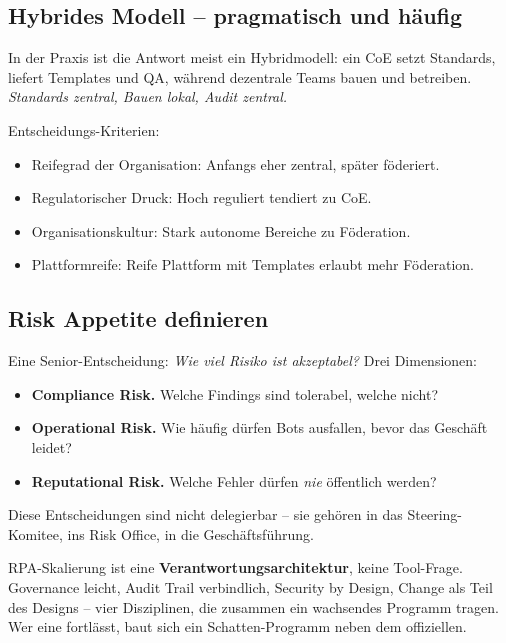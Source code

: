 \documentclass[11pt,a4paper,oneside]{article}
\begin{document}
\subsection{Hybrides Modell -- pragmatisch und häufig}

In der Praxis ist die Antwort meist ein Hybridmodell: ein CoE setzt Standards, liefert Templates und QA, während dezentrale Teams bauen und betreiben. \emph{Standards zentral, Bauen lokal, Audit zentral.}

Entscheidungs-Kriterien:

\begin{itemize}
  \item Reifegrad der Organisation: Anfangs eher zentral, später föderiert.
  \item Regulatorischer Druck: Hoch reguliert tendiert zu CoE.
  \item Organisationskultur: Stark autonome Bereiche zu Föderation.
  \item Plattformreife: Reife Plattform mit Templates erlaubt mehr Föderation.
\end{itemize}

\subsection{Risk Appetite definieren}

Eine Senior-Entscheidung: \emph{Wie viel Risiko ist akzeptabel?} Drei Dimensionen:

\begin{itemize}
  \item \textbf{Compliance Risk.} Welche Findings sind tolerabel, welche nicht?
  \item \textbf{Operational Risk.} Wie häufig dürfen Bots ausfallen, bevor das Geschäft leidet?
  \item \textbf{Reputational Risk.} Welche Fehler dürfen \emph{nie} öffentlich werden?
\end{itemize}

Diese Entscheidungen sind nicht delegierbar -- sie gehören in das Steering-Komitee, ins Risk Office, in die Geschäftsführung.

\begin{merkbox}
RPA-Skalierung ist eine \textbf{Verantwortungsarchitektur}, keine Tool-Frage. Governance leicht, Audit Trail verbindlich, Security by Design, Change als Teil des Designs -- vier Disziplinen, die zusammen ein wachsendes Programm tragen. Wer eine fortlässt, baut sich ein Schatten-Programm neben dem offiziellen.
\end{merkbox}
\end{document}
